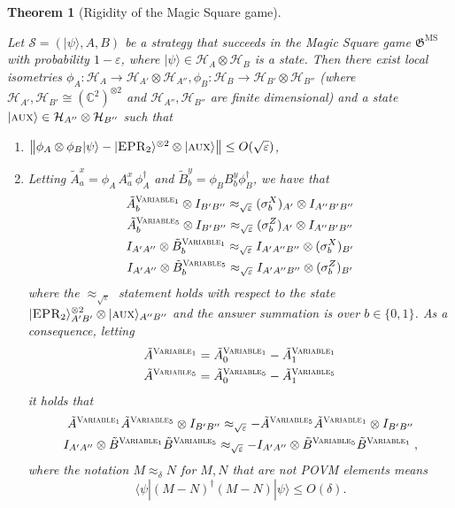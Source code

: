 \documentclass[11pt]{article}
\newtheorem{theorem}{Theorem}[section]
\theoremstyle{definition}
\newcommand{\ket}[1]{|#1\rangle}
\newcommand{\bra}[1]{\langle#1|}
\newcommand{\C}{\ensuremath{\mathbb{C}}}
\newcommand{\mH}{\ensuremath{\mathcal{H}}}
\newcommand{\eps}{\varepsilon}
\newcommand{\game}{\mathfrak{G}}
\newcommand{\strategy}{\mathscr{S}}
\newcommand{\labelstyle}[1]{\ensuremath{\textsc{#1}}\xspace}
\newcommand{\EPR}{\labelstyle{EPR}}
\newcommand{\aux}{\labelstyle{aux}}
\newcommand{\typestyle}[1]{\ensuremath{\textsc{#1}}\xspace}
\newcommand{\Variable}{\typestyle{Variable}}
\newcommand{\MS}{\mathrm{MS}}
\begin{document}
\begin{theorem}[Rigidity of the Magic Square game]
  \label{thm:ms-rigidity}


Let $\strategy = (\ket{\psi},A,B)$ be a strategy that succeeds in the Magic Square game $\game^{\MS}$ with probability $1 - \eps$, where $\ket{\psi} \in \mH_A \otimes \mH_B$ is a state. Then there exist local isometries $\phi_A: \mH_A \to \mH_{A'} \otimes \mH_{A''},\phi_B: \mH_B \to \mH_{B'} \otimes \mH_{B''}$ (where $\mH_{A'},\mH_{B'} \cong (\C^2)^{\otimes 2}$ and $\mH_{A''},\mH_{B''}$ are finite dimensional) and a state $\ket{\aux} \in \mH_{A''} \otimes \mH_{B''}$ such that 
\begin{enumerate}
    \item $\left \| \phi_A \otimes \phi_B \ket{\psi} - \ket{\EPR_2}^{\otimes 2} \otimes \ket{\aux} \right \| \leq O(\sqrt{\eps})$,
    \item Letting $\tilde{A}^x_a = \phi_A\, A^x_a \, \phi_A^\dagger$ and $\tilde{B}^y_b = \phi_B B^y_b \phi_B^\dagger$, we have that
    \begin{gather*}
        \tilde{A}^{\Variable_1}_b \otimes I_{B'B''} \approx_{\sqrt{\eps}} (\sigma^X_b)_{A'} \otimes I_{A'' B' B''} \\
        \tilde{A}^{\Variable_5}_b \otimes I_{B'B''} \approx_{\sqrt{\eps}} (\sigma^Z_b)_{A'} \otimes I_{A'' B' B''} \\
        I_{A'A''} \otimes \tilde{B}^{\Variable_1}_b    \approx_{\sqrt{\eps}} I_{A' A'' B''} \otimes (\sigma^X_b)_{B'} \\
        I_{A'A''} \otimes \tilde{B}^{\Variable_5}_b    \approx_{\sqrt{\eps}} I_{A' A'' B''} \otimes (\sigma^Z_b)_{B'}
    \end{gather*}
    where the $\approx_{\sqrt{\eps}}$ statement holds with respect to the state $\ket{\EPR_2}^{\otimes 2}_{A'B'} \otimes \ket{\aux}_{A''B''}$ and the answer summation is over $b \in \{0,1\}$. As a consequence, letting 
    \begin{gather*}
    \tilde{A}^{\Variable_1} = \tilde{A}^{\Variable_1}_0 - \tilde{A}^{\Variable_1}_1 \\
    \tilde{A}^{\Variable_5} = \tilde{A}^{\Variable_5}_0 - \tilde{A}^{\Variable_5}_1 \\
    \end{gather*}
    it holds that
    \begin{gather*}
        \tilde{A}^{\Variable_1} \tilde{A}^{\Variable_5} \otimes I_{B' B''} \approx_{\sqrt{\eps}} - \tilde{A}^{\Variable_5}  \tilde{A}^{\Variable_1} \otimes I_{B' B''} \\
        I_{A' A''} \otimes \tilde{B}^{\Variable_1} \tilde{B}^{\Variable_5}  \approx_{\sqrt{\eps}} - I_{A' A''} \otimes \tilde{B}^{\Variable_5}  \tilde{B}^{\Variable_1} \;,
      \end{gather*}
      where the notation $M \approx_{\delta} N$ for $M, N$ that are not POVM
      elements means
      \[  \bra{\psi} (M-N)^\dagger (M-N) \ket{\psi}  \leq  O(\delta). \]
\end{enumerate}

\end{theorem}
\end{document}
